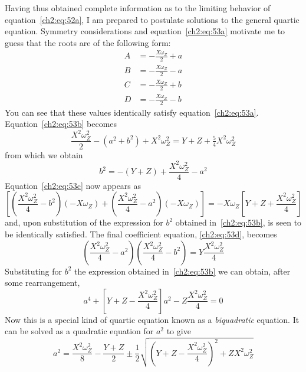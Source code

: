 Having thus obtained complete information as to the limiting behavior of
equation~\eqref{ch2:eq:52a}, I am prepared to postulate solutions to the
general quartic equation. Symmetry considerations and
equation~\eqref{ch2:eq:53a} motivate me to guess that the roots are of the
following form:
\begin{align*}
A &= -\frac{X\omega_Z}{2} + a\\
B &= -\frac{X\omega_Z}{2} - a\\
C &= -\frac{X\omega_Z}{2} + b\\
D &= -\frac{X\omega_Z}{2} - b
\end{align*}
You can see that these values identically satisfy
equation~\eqref{ch2:eq:53a}. Equation~\eqref{ch2:eq:53b} becomes
\begin{equation*}
\frac{X^2\omega_Z^2}{2} - (a^2 + b^2) + X^2\omega_Z^2
  = Y + Z + \tfrac{5}{4}X^2\omega_Z^2
\end{equation*}
from which we obtain
\begin{equation*}
b^2 = -(Y + Z) + \frac{X^2\omega_Z^2}{4} - a^2
\end{equation*}
Equation~\eqref{ch2:eq:53c} now appears as
\begin{equation*}
\left[\left(\frac{X^2\omega_Z^2}{4} - b^2\right)(-X\omega_Z)
  + \left(\frac{X^2\omega_Z^2}{4} - a^2\right)(-X\omega_Z)\right]
  = -X\omega_Z\left[Y + Z + \frac{X^2\omega_Z^2}{4}\right]
\end{equation*}
and, upon substitution of the expression for $b^2$ obtained
in~\eqref{ch2:eq:53b}, is seen to be identically satisfied. The final
coefficient equation, \eqref{ch2:eq:53d}, becomes
\begin{equation*}
\left(\frac{X^2\omega_Z^2}{4} - a^2\right)\left(\frac{X^2\omega_Z^2}{4} - b^2\right)
  = Y\frac{X^2\omega_Z^2}{4}
\end{equation*}
Substituting for $b^2$ the expression obtained in~\eqref{ch2:eq:53b} we can
obtain, after some rearrangement,
\begin{equation*}
a^4 + \left[Y + Z - \frac{X^2\omega_Z^2}{4}\right]a^2
  - Z\frac{X^2\omega_Z^2}{4} = 0
\end{equation*}
Now this is a special kind of quartic equation known as a \emph{biquadratic}
equation. It can be solved as a quadratic equation for $a^2$ to give
\begin{equation*}
a^2 = \frac{X^2\omega_Z^2}{8} - \frac{Y + Z}{2}
  \pm \frac{1}{2}\sqrt{\left(Y + Z - \frac{X^2\omega_Z^2}{4}\right)^2
    + ZX^2\omega_Z^2}
\end{equation*}
